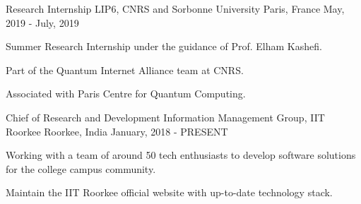 \begin{cventries}
  \cventry
    {Research Internship} %
    {LIP6, CNRS and Sorbonne University} %
    {Paris, France} %
    {May, 2019 - July, 2019} %
    {
      \begin{cvitems} %
        \item {Summer Research Internship under the guidance of Prof. Elham Kashefi.}
        \item {Part of the Quantum Internet Alliance team at CNRS.}
        \item {Associated with Paris Centre for Quantum Computing.}
      \end{cvitems}
    }

  \cventry
    {Chief of Research and Development} %
    {Information Management Group, IIT Roorkee} %
    {Roorkee, India} %
    {January, 2018 - PRESENT} %
    {
      \begin{cvitems} %
        \item {Working with a team of around 50 tech enthusiasts to develop software solutions for the college campus community.}
        \item {Maintain the IIT Roorkee official website with up-to-date technology stack.}
      \end{cvitems}
    }

\end{cventries}